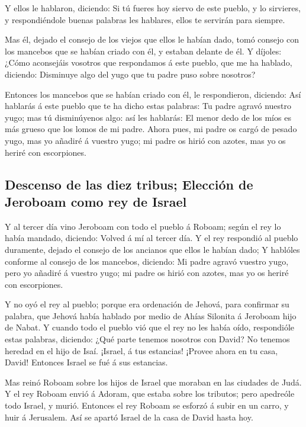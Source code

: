  Y ellos le hablaron, diciendo: Si tú fueres hoy siervo de
este pueblo, y lo sirvieres, y respondiéndole buenas palabras les
hablares, ellos te servirán para siempre.

 Mas él, dejado el consejo de los viejos que ellos le
habían dado, tomó consejo con los mancebos que se habían criado con él,
y estaban delante de él.  Y díjoles: ¿Cómo aconsejáis
vosotros que respondamos á este pueblo, que me ha hablado, diciendo:
Disminuye algo del yugo que tu padre puso sobre nosotros?

 Entonces los mancebos que se habían criado con él, le
respondieron, diciendo: Así hablarás á este pueblo que te ha dicho estas
palabras: Tu padre agravó nuestro yugo; mas tú disminúyenos algo: así
les hablarás: El menor dedo de los míos es más grueso que los lomos de
mi padre.  Ahora pues, mi padre os cargó de pesado yugo,
mas yo añadiré á vuestro yugo; mi padre os hirió con azotes, mas yo os
heriré con escorpiones.

\hypertarget{descenso-de-las-diez-tribus-elecciuxf3n-de-jeroboam-como-rey-de-israel}{%
\subsection{Descenso de las diez tribus; Elección de Jeroboam como rey
de
Israel}\label{descenso-de-las-diez-tribus-elecciuxf3n-de-jeroboam-como-rey-de-israel}}

 Y al tercer día vino Jeroboam con todo el pueblo á
Roboam; según el rey lo había mandado, diciendo: Volved á mí al tercer
día.  Y el rey respondió al pueblo duramente, dejado el
consejo de los ancianos que ellos le habían dado;  Y
hablóles conforme al consejo de los mancebos, diciendo: Mi padre agravó
vuestro yugo, pero yo añadiré á vuestro yugo; mi padre os hirió con
azotes, mas yo os heriré con escorpiones.

 Y no oyó el rey al pueblo; porque era ordenación de
Jehová, para confirmar su palabra, que Jehová había hablado por medio de
Ahías Silonita á Jeroboam hijo de Nabat.  Y cuando todo
el pueblo vió que el rey no les había oído, respondióle estas palabras,
diciendo: ¿Qué parte tenemos nosotros con David? No tenemos heredad en
el hijo de Isaí. ¡Israel, á tus estancias! ¡Provee ahora en tu casa,
David! Entonces Israel se fué á sus estancias.

 Mas reinó Roboam sobre los hijos de Israel que moraban
en las ciudades de Judá.  Y el rey Roboam envió á Adoram,
que estaba sobre los tributos; pero apedreóle todo Israel, y murió.
Entonces el rey Roboam se esforzó á subir en un carro, y huir á
Jerusalem.  Así se apartó Israel de la casa de David
hasta hoy.

